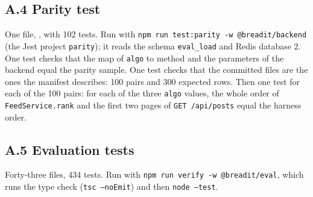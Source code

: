 \subsection*{A.4 Parity test}

{\small\singlespacing
One file, , with 102 tests. Run with \texttt{npm run test:parity -w @breadit/backend} (the Jest project \texttt{parity}); it reads the schema \texttt{eval\_load} and Redis database 2. One test checks that the map of \texttt{algo} to method and the parameters of the backend equal the parity sample. One test checks that the committed files are the ones the manifest describes: 100 pairs and 300 expected rows. Then one test for each of the 100 pairs: for each of the three \texttt{algo} values, the whole order of \texttt{FeedService.rank} and the first two pages of \texttt{GET /api/posts} equal the harness order.\par}

\subsection*{A.5 Evaluation tests}

Forty-three files, 434 tests. Run with \texttt{npm run verify -w @breadit/eval}, which runs the type check (\texttt{tsc --noEmit}) and then \texttt{node --test}.

